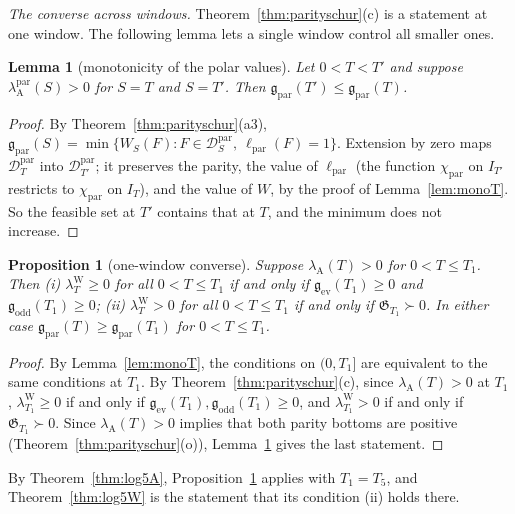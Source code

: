 \documentclass[11pt]{amsart}
\newtheorem{proposition}[theorem]{Proposition}
\newtheorem{lemma}[theorem]{Lemma}
\theoremstyle{definition}
\theoremstyle{remark}
\newcommand{\IT}{I_T}
\newcommand{\lamW}{\lambda^{\mathrm W}_T}
\newcommand{\lamA}{\lambda_{\mathrm A}(T)}
\begin{document}
\emph{The converse across windows.} Theorem~\ref{thm:parityschur}(c) is a statement at one window. The
following lemma lets a single window control all smaller ones.

\begin{lemma}[monotonicity of the polar values]\label{lem:gmono}
Let $0<T<T'$ and suppose $\lambda^{\mathrm{par}}_{\mathrm A}(S)>0$ for $S=T$ and $S=T'$. Then
$\mathfrak g_{\mathrm{par}}(T')\le\mathfrak g_{\mathrm{par}}(T)$.
\end{lemma}
\begin{proof}
By Theorem~\ref{thm:parityschur}(a3),
$\mathfrak g_{\mathrm{par}}(S)=\min\{W_S(F):F\in\mathcal D^{\mathrm{par}}_S,\ \ell_{\mathrm{par}}(F)=1\}$. Extension by
zero maps $\mathcal D^{\mathrm{par}}_T$ into $\mathcal D^{\mathrm{par}}_{T'}$; it preserves the parity, the value of
$\ell_{\mathrm{par}}$ (the function $\chi_{\mathrm{par}}$ on $I_{T'}$ restricts to $\chi_{\mathrm{par}}$ on $\IT$),
and the value of $W$, by the proof of Lemma~\ref{lem:monoT}. So the feasible set at $T'$ contains that at
$T$, and the minimum does not increase.
\end{proof}

\begin{proposition}[one-window converse]\label{prop:onewindow}
Suppose $\lamA>0$ for $0<T\le T_1$. Then
\emph{(i)} $\lamW\ge0$ for all $0<T\le T_1$ if and only if $\mathfrak g_{\mathrm{ev}}(T_1)\ge0$ and
$\mathfrak g_{\mathrm{odd}}(T_1)\ge0$;
\emph{(ii)} $\lamW>0$ for all $0<T\le T_1$ if and only if $\mathfrak G_{T_1}\succ0$.
In either case $\mathfrak g_{\mathrm{par}}(T)\ge\mathfrak g_{\mathrm{par}}(T_1)$ for $0<T\le T_1$.
\end{proposition}
\begin{proof}
By Lemma~\ref{lem:monoT}, the conditions on $(0,T_1]$ are equivalent to the same conditions at $T_1$. By
Theorem~\ref{thm:parityschur}(c), since $\lamA>0$ at $T_1$, $\lambda^{\mathrm W}_{T_1}\ge0$ if and only if
$\mathfrak g_{\mathrm{ev}}(T_1),\mathfrak g_{\mathrm{odd}}(T_1)\ge0$, and $\lambda^{\mathrm W}_{T_1}>0$ if and only if
$\mathfrak G_{T_1}\succ0$. Since $\lamA>0$ implies that both parity bottoms are positive
(Theorem~\ref{thm:parityschur}(o)), Lemma~\ref{lem:gmono} gives the last statement.
\end{proof}

By Theorem~\ref{thm:log5A}, Proposition~\ref{prop:onewindow} applies with $T_1=T_5$, and
Theorem~\ref{thm:log5W} is the statement that its condition (ii) holds there.
\end{document}
